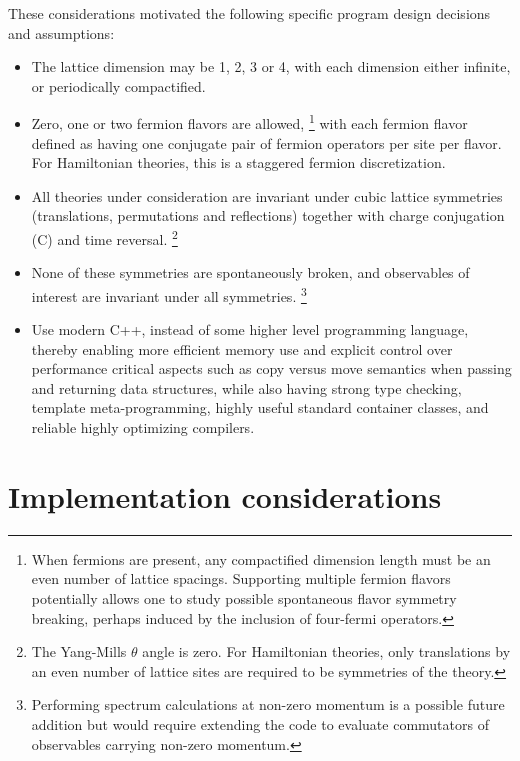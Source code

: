 \documentclass [12pt]{article}
\begin{document}
These considerations motivated the following
specific program design decisions and assumptions:
\begin{itemize}

\item
    The lattice dimension may be 1, 2, 3 or 4, with each dimension
    either infinite, or periodically compactified.

\item
    Zero, one or two fermion flavors are allowed,%
    \footnote
	{%
	When fermions are present,
	any compactified dimension length must be
	an even number of lattice spacings.
	Supporting multiple fermion flavors potentially allows one to
	study possible spontaneous flavor symmetry breaking,
	perhaps induced by the inclusion of four-fermi operators.
	}
    with each fermion flavor defined as having one conjugate pair of
    fermion operators per site per flavor.
    For Hamiltonian theories, this is a staggered fermion discretization.

\item
    All theories under consideration are invariant under cubic
    lattice symmetries (translations, permutations and reflections)
    together with charge conjugation (C) and time reversal.%
    \footnote
	{%
	The Yang-Mills $\theta$ angle is zero.
	For Hamiltonian theories,
	only translations by an even number of lattice sites are 
	required to be symmetries of the theory.
	}

\item
    None of these symmetries are spontaneously broken, and
    observables of interest are invariant under all symmetries.%
    \footnote
	{%
	Performing spectrum calculations at
	non-zero momentum is a possible future addition but
	would require extending the code to evaluate
	commutators of observables carrying non-zero momentum.
	}

\item
    Use modern C++, instead of some higher level programming language,
    thereby enabling more efficient memory use and explicit
    control over performance critical aspects
    such as copy versus move semantics when passing
    and returning data structures,
    while also having strong type checking, template meta-programming,
    highly useful standard container classes, and reliable highly
    optimizing compilers.

\end{itemize}
\medskip

\section {Implementation considerations}
\end{document}
